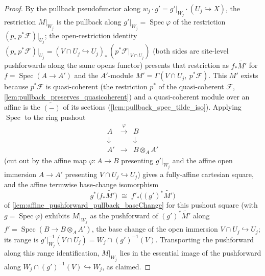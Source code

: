 \begin{proof}\leanok
  By the pullback pseudofunctor along \(w_j \cdot g' = g'|_{W_j} \cdot (U_j \hookrightarrow X)\),
  the restriction \(M|_{W_j}\) is the pullback along \(g'|_{W_j} = \operatorname{Spec}\varphi\) of
  the restriction \((p_*\,p^*\mathcal{F})|_{U_j}\); the open-restriction identity
  \((p_*\,p^*\mathcal{F})|_{U_j} = (V \cap U_j \hookrightarrow U_j)_*\,(p^*\mathcal{F}|_{V \cap U_j})\)
  (both sides are site-level pushforwards along the same opens functor) presents that restriction
  as \(f_*\widetilde{M'}\) for \(f = \operatorname{Spec}(A \to A')\) and the
  \(A'\)-module \(M' = \Gamma(V \cap U_j,\ p^*\mathcal{F})\). This \(M'\) exists because
  \(p^*\mathcal{F}\) is quasi-coherent (the restriction \(p^*\) of the quasi-coherent
  \(\mathcal{F}\), \cref{lem:pullback_preserves_quasicoherent}) and a quasi-coherent module over an
  affine is the \(\widetilde{(-)}\) of its sections (\cref{lem:pullback_spec_tilde_iso}).
  Applying \(\operatorname{Spec}\) to the ring pushout
  \[
    \begin{array}{ccc}
      A & \xrightarrow{\ \varphi\ } & B\\
      \downarrow & & \downarrow\\
      A' & \longrightarrow & B \otimes_A A'
    \end{array}
  \]
  (cut out by the affine map \(\varphi : A \to B\) presenting \(g'|_{W_j}\) and the affine open
  immersion \(A \to A'\) presenting \(V \cap U_j \hookrightarrow U_j\)) gives a fully-affine
  cartesian square, and the affine termwise base-change isomorphism
  \[
    g^*\bigl(f_*\widetilde{M'}\bigr) \;\cong\; f'_*\bigl((g')^*\widetilde{M'}\bigr)
  \]
  of \cref{lem:affine_pushforward_pullback_baseChange} for this pushout square (with
  \(g = \operatorname{Spec}\varphi\)) exhibits \(M|_{W_j}\) as the pushforward of
  \((g')^*\widetilde{M'}\) along \(f' = \operatorname{Spec}(B \to B \otimes_A A')\), the base
  change of the open immersion \(V \cap U_j \hookrightarrow U_j\); its range is
  \(g'|_{W_j}^{-1}(V \cap U_j) = W_j \cap (g')^{-1}(V)\).  Transporting the pushforward along
  this range identification, \(M|_{W_j}\) lies in the essential image of the pushforward along
  \(W_j \cap (g')^{-1}(V) \hookrightarrow W_j\), as claimed.
\end{proof}

